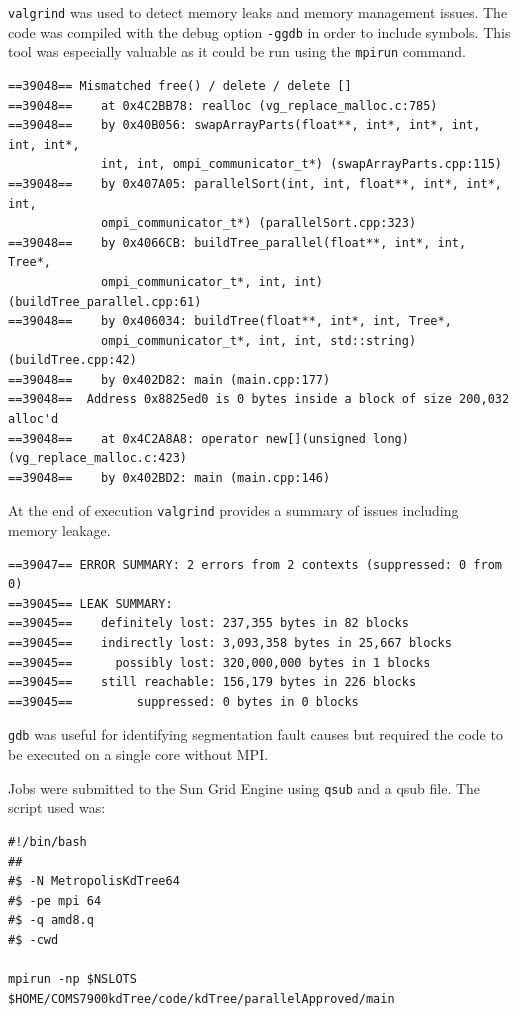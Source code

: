 \documentclass{article}
\begin{document}
\texttt{valgrind} was used to detect memory leaks and memory management issues. The code was compiled with the debug option \texttt{-ggdb} in order to include symbols. This tool was especially valuable as it could be run using the \texttt{mpirun} command.

\begin{verbatim}
==39048== Mismatched free() / delete / delete []
==39048==    at 0x4C2BB78: realloc (vg_replace_malloc.c:785)
==39048==    by 0x40B056: swapArrayParts(float**, int*, int*, int, int, int*, 
             int, int, ompi_communicator_t*) (swapArrayParts.cpp:115)
==39048==    by 0x407A05: parallelSort(int, int, float**, int*, int*, int, 
             ompi_communicator_t*) (parallelSort.cpp:323)
==39048==    by 0x4066CB: buildTree_parallel(float**, int*, int, Tree*, 
             ompi_communicator_t*, int, int) (buildTree_parallel.cpp:61)
==39048==    by 0x406034: buildTree(float**, int*, int, Tree*, 
             ompi_communicator_t*, int, int, std::string) (buildTree.cpp:42)
==39048==    by 0x402D82: main (main.cpp:177)
==39048==  Address 0x8825ed0 is 0 bytes inside a block of size 200,032 alloc'd
==39048==    at 0x4C2A8A8: operator new[](unsigned long) (vg_replace_malloc.c:423)
==39048==    by 0x402BD2: main (main.cpp:146)
\end{verbatim}

At the end of execution \texttt{valgrind} provides a summary of issues including memory leakage.

\begin{verbatim}
==39047== ERROR SUMMARY: 2 errors from 2 contexts (suppressed: 0 from 0)
==39045== LEAK SUMMARY:
==39045==    definitely lost: 237,355 bytes in 82 blocks
==39045==    indirectly lost: 3,093,358 bytes in 25,667 blocks
==39045==      possibly lost: 320,000,000 bytes in 1 blocks
==39045==    still reachable: 156,179 bytes in 226 blocks
==39045==         suppressed: 0 bytes in 0 blocks
\end{verbatim}

\texttt{gdb} was useful for identifying segmentation fault causes but required the code to be executed on a single core without MPI.

Jobs were submitted to the Sun Grid Engine using \texttt{qsub} and a qsub file. The script used was:

\begin{minipage}{\linewidth}
\lstset{language=bash, keepspaces=true}
\begin{lstlisting}
#!/bin/bash
##
#$ -N MetropolisKdTree64
#$ -pe mpi 64
#$ -q amd8.q
#$ -cwd

mpirun -np $NSLOTS $HOME/COMS7900kdTree/code/kdTree/parallelApproved/main
\end{lstlisting}
\end{minipage}
\end{document}
